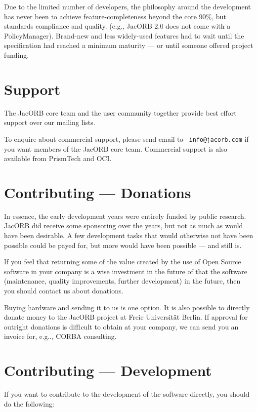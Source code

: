 Due to the limited number of developers, the philosophy around the
development has never been to achieve feature-completeness beyond the
core 90\%, but standards compliance and quality.  (e.g., JacORB 2.0
does not come with a PolicyManager).  Brand-new and less widely-used
features had to wait until the specification had reached a minimum
maturity --- or until someone offered project funding.

\section{Support}

The JacORB core team and the user community together provide best
effort support over our mailing lists. 

To enquire about commercial support, please send email to {\tt
  info@jacorb.com} if you want members of the JacORB core team.
Commercial support is also available from PrismTech and OCI.

\section{Contributing --- Donations}

In essence, the early development years were entirely funded by public
research. JacORB did receive some sponsoring over the years, but not
as much as would have been desirable. A few development tasks that
would otherwise not have been possible could be payed for, but more
would have been possible --- and still is. 

If you feel that returning some of the value created by the use of
Open Source software in your company is a wise investment in the
future of that the software (maintenance, quality improvements,
further development) in the future, then you should contact us about
donations.

Buying hardware and sending it to us is one option. It is also
possible to directly donate money to the JacORB project at Freie
Universit{\"a}t Berlin. If approval for outright donations is
difficult to obtain at your company, we can send you an invoice for,
e.g.., CORBA consulting.

\section{Contributing --- Development}

If you want to contribute to the development of the software directly,
you should do the following:


